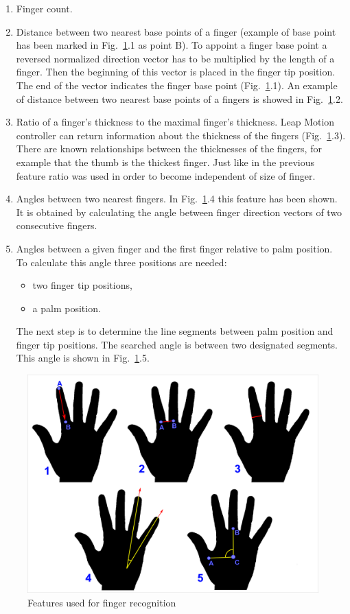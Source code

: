 \begin{enumerate}
\item Finger count. 
\item Distance between two nearest base points of a finger (example of base point has been marked in Fig.~\ref{fingfifffeatures}.1 as point B).
To appoint a finger base point a reversed normalized direction vector has to be multiplied by the length of a finger. Then the beginning of this vector is placed in the finger tip position. The end of the vector indicates the finger base point (Fig.~\ref{fingfifffeatures}.1). An example of distance between two nearest base points of a fingers is showed in Fig.~\ref{fingfifffeatures}.2.
\item Ratio of a finger's thickness to the maximal finger's thickness. 
Leap Motion controller can return information about the thickness of the fingers (Fig.~\ref{fingfifffeatures}.3). There are known relationships between the thicknesses of the fingers, for example that the thumb is the thickest finger. Just like in the previous feature ratio was used in order to become independent of size of finger.
\item Angles between two nearest fingers.
In Fig.~\ref{fingfifffeatures}.4  this feature has been shown. It is obtained by calculating the angle between finger direction vectors of two consecutive fingers.
\item Angles between a given finger and the first finger relative to palm position. 
To calculate this angle three positions are needed:
\begin{itemize}
\item two finger tip positions,
\item a palm position.
\end{itemize}
The next step is to determine the line segments between palm position and finger tip positions. The searched angle is between two designated segments. This angle is shown in Fig.~\ref{fingfifffeatures}.5.
\end{enumerate}

\begin{figure}[htb]
\centering
 \includegraphics[width=0.75\columnwidth]{figures/fingDiffFeatures.png}
 \caption{Features used for finger recognition}
 \label{fingfifffeatures}
\end{figure}

